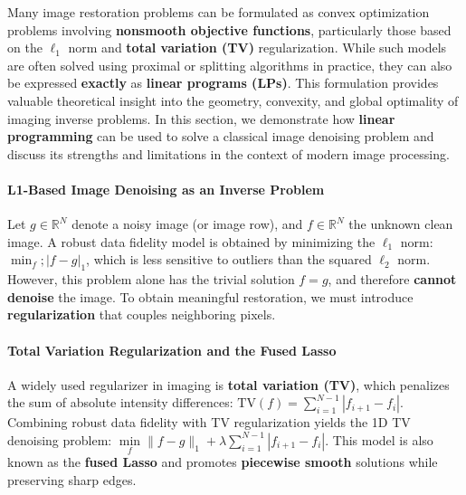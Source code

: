 \documentclass[11pt]{article}
\begin{document}
Many image restoration problems can be formulated as convex optimization
problems involving \textbf{nonsmooth objective functions}, particularly
those based on the \(\ell_1\) norm and \textbf{total variation (TV)}
regularization. While such models are often solved using proximal or
splitting algorithms in practice, they can also be expressed
\textbf{exactly} as \textbf{linear programs (LPs)}. This formulation
provides valuable theoretical insight into the geometry, convexity, and
global optimality of imaging inverse problems. In this section, we
demonstrate how \textbf{linear programming} can be used to solve a
classical image denoising problem and discuss its strengths and
limitations in the context of modern image processing.

\hypertarget{l1-based-image-denoising-as-an-inverse-problem}{%
\paragraph{\texorpdfstring{\textbf{L1-Based Image Denoising as an
Inverse
Problem}}{L1-Based Image Denoising as an Inverse Problem}}\label{l1-based-image-denoising-as-an-inverse-problem}}

Let \(g \in \mathbb{R}^N\) denote a noisy image (or image row), and
\(f \in \mathbb{R}^N\) the unknown clean image. A robust data fidelity
model is obtained by minimizing the \(\ell_1\) norm:
\(\min_f ; | f - g |_1\), which is less sensitive to outliers than the
squared \(\ell_2\) norm. However, this problem alone has the trivial
solution \(f = g\), and therefore \textbf{cannot denoise} the image. To
obtain meaningful restoration, we must introduce \textbf{regularization}
that couples neighboring pixels.

\hypertarget{total-variation-regularization-and-the-fused-lasso}{%
\paragraph{\texorpdfstring{\textbf{Total Variation Regularization and
the Fused
Lasso}}{Total Variation Regularization and the Fused Lasso}}\label{total-variation-regularization-and-the-fused-lasso}}

A widely used regularizer in imaging is \textbf{total variation (TV)},
which penalizes the sum of absolute intensity differences:
\(\mathrm{TV}(f) = \sum\limits_{i=1}^{N-1} | f_{i+1} - f_i |\).
Combining robust data fidelity with TV regularization yields the 1D TV
denoising problem:
\(\boxed{ \underset{f}{\min} \| f - g \|_1 + \lambda \sum\limits_{i=1}^{N-1} | f_{i+1} - f_i |}\).
This model is also known as the \textbf{fused Lasso} and promotes
\textbf{piecewise smooth} solutions while preserving sharp edges.
\end{document}
